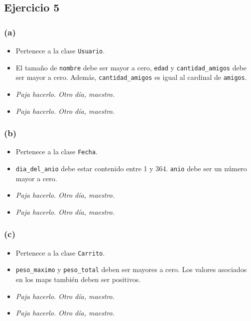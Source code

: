 \documentclass[12 pt]{article}
\begin{document}
\subsection*{Ejercicio 5}
    \subsubsection*{(a)}
        \begin{itemize}
            \item Pertenece a la clase \texttt{Usuario}.
            \item El tamaño de \texttt{nombre} debe ser mayor a cero, \texttt{edad} y \texttt{cantidad\_amigos} debe ser mayor a cero. Además, \texttt{cantidad\_amigos} es igual al cardinal de \texttt{amigos}.
            \item \textit{Paja hacerlo. Otro día, maestro.}
            \item \textit{Paja hacerlo. Otro día, maestro.}
        \end{itemize}

    \subsubsection*{(b)}
        \begin{itemize}
            \item Pertenece a la clase \texttt{Fecha}.
            \item \texttt{dia\_del\_anio} debe estar contenido entre 1 y 364. \texttt{anio} debe ser un número mayor a cero.
            \item \textit{Paja hacerlo. Otro día, maestro.}
            \item \textit{Paja hacerlo. Otro día, maestro.}
        \end{itemize}
        
    \subsubsection*{(c)}
        \begin{itemize}
            \item Pertenece a la clase \texttt{Carrito}.
            \item \texttt{peso\_maximo} y \texttt{peso\_total} deben ser mayores a cero. Los valores asociados en los maps también deben ser positivos.
            \item \textit{Paja hacerlo. Otro día, maestro.}
            \item \textit{Paja hacerlo. Otro día, maestro.}
        \end{itemize}
\end{document}
